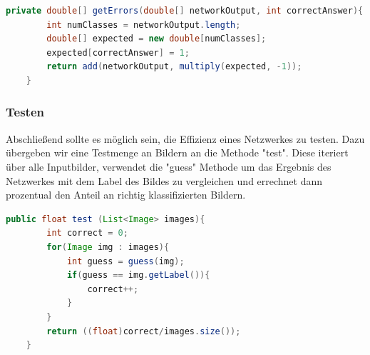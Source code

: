 \documentclass[12pt]{article}
\begin{document}
\begin{lstlisting}[language=Java]
private double[] getErrors(double[] networkOutput, int correctAnswer){
        int numClasses = networkOutput.length;
        double[] expected = new double[numClasses];
        expected[correctAnswer] = 1;
        return add(networkOutput, multiply(expected, -1));
    }
\end{lstlisting}

\subsubsection{Testen}

Abschließend sollte es möglich sein, die Effizienz eines Netzwerkes zu testen. Dazu übergeben wir eine Testmenge an Bildern an die Methode "test". Diese iteriert über alle Inputbilder, verwendet die "guess" Methode um das Ergebnis des Netzwerkes mit dem Label des Bildes zu vergleichen und errechnet dann prozentual den Anteil an richtig klassifizierten Bildern.

\begin{lstlisting}[language=Java]
    public float test (List<Image> images){
        int correct = 0;
        for(Image img : images){
            int guess = guess(img);
            if(guess == img.getLabel()){
                correct++;
            }
        }
        return ((float)correct/images.size());
    }
 \end{lstlisting}
\end{document}
